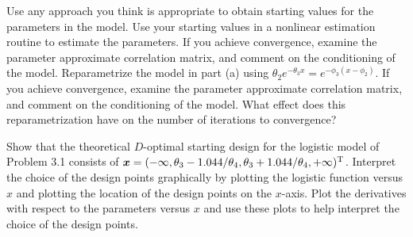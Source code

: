 \begin{problems}
  \subprob Use any approach you think is appropriate to obtain
  starting values for the parameters in the model.
  \subprob Use your starting values in a nonlinear estimation
  routine to estimate the parameters.
  If you achieve convergence, examine the parameter
  approximate correlation matrix, and comment on the
  conditioning of the model.
  \subprob Reparametrize the model in part (a) using $\theta_2
  e^{ - \theta_3 x }= e^{ - \phi_3 ( x - \phi_2 ) }$.
  If you achieve convergence, examine the parameter
  approximate correlation matrix, and comment on the
  conditioning of the model.
  What effect does this reparametrization have on the
  number of iterations to convergence?
  
  \prob 
  
  \subprob Show that the theoretical $D$-optimal starting
  design for the logistic model of Problem 3.1
  consists of $\bx=(-\infty,\theta_3-1.044/
  \theta_4,\theta_3+1.044/ \theta_4,+\infty)\trans$. 
  \subprob Interpret the choice of the design points
  graphically by plotting the logistic function versus
  $x$ and plotting the location of the design points
  on the $x$-axis.
  \subprob Plot the derivatives with respect to the parameters
  versus $x$ and use these plots to help interpret the
  choice of the design points.
  
\end{problems}

